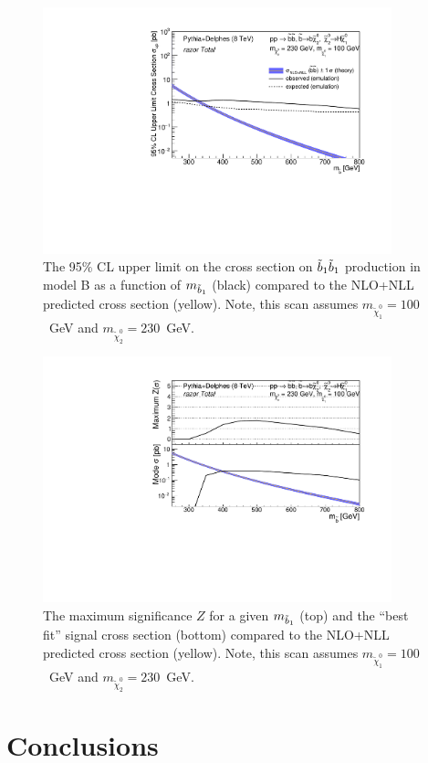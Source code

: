 \begin{figure}[htb]\centering
\includegraphics[width=0.9\textwidth]{figs/pheno/xsecUL_T2bH_100_Total.pdf}
\caption{\label{fig:T2bH1dLimit} The 95\% CL upper limit on the
  cross section on $\tilde{b}_1\tilde{b}_1$ production in model B as a function of $m_{\tilde{b}_1}$ (black) compared
  to the NLO+NLL predicted cross section (yellow). Note, this scan assumes
  $m_{\tilde\chi_1^0}=100$~GeV and $m_{\tilde{\chi}_2^0}=230$~GeV.}
\end{figure}

\begin{figure}[htb]\centering
\includegraphics[width=0.9\textwidth]{figs/pheno/signif_T2bH_100_Total.pdf}
\caption{\label{fig:T2bH1dSignif} The maximum significance $Z$ for a
  given $m_{\tilde{b}_1}$ (top) and the ``best fit'' signal cross
  section (bottom) compared to the NLO+NLL predicted cross section (yellow). Note, this scan assumes
  $m_{\tilde\chi_1^0}=100$~GeV and $m_{\tilde{\chi}_2^0}=230$~GeV.}
\end{figure}


\section{Conclusions}
\label{sec:conclusions}